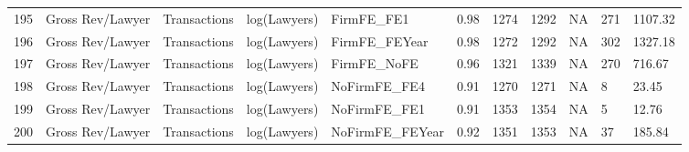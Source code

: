 \documentclass{article}
\begin{document}
\begin{table}[H]
\begin{tabular}{rllllllllll}
  195 & Gross Rev/Lawyer & Transactions & log(Lawyers) & FirmFE\_FE1 & 0.98 & 1274 & 1292 & NA & 271 & 1107.32 \\ 
  196 & Gross Rev/Lawyer & Transactions & log(Lawyers) & FirmFE\_FEYear & 0.98 & 1272 & 1292 & NA & 302 & 1327.18 \\ 
  197 & Gross Rev/Lawyer & Transactions & log(Lawyers) & FirmFE\_NoFE & 0.96 & 1321 & 1339 & NA & 270 & 716.67 \\ 
  198 & Gross Rev/Lawyer & Transactions & log(Lawyers) & NoFirmFE\_FE4 & 0.91 & 1270 & 1271 & NA & 8 & 23.45 \\ 
  199 & Gross Rev/Lawyer & Transactions & log(Lawyers) & NoFirmFE\_FE1 & 0.91 & 1353 & 1354 & NA & 5 & 12.76 \\ 
  200 & Gross Rev/Lawyer & Transactions & log(Lawyers) & NoFirmFE\_FEYear & 0.92 & 1351 & 1353 & NA & 37 & 185.84 \\ 
   \hline
\end{tabular}
\end{table}
\end{document}
